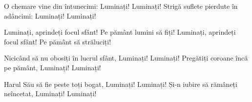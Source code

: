 \beginverse
O chemare vine din întunecimi:
Luminați! Luminați!
Strigă suflete pierdute în adâncimi:
Luminați! Luminați!
\endverse

\beginchorus
Luminați, aprindeți focul sfânt!
Pe pământ lumini să fiți!
Luminați, aprindeți focul sfânt!
Pe pământ să străluciți!
\endchorus

\beginverse
Nicicând să nu obosiți în lucrul sfânt,
Luminați! Luminați!
Pregătiți coroane încă pe pământ,
Luminați! Luminați!
\endverse

\beginverse
Harul Său să fie peste toți bogat,
Luminați! Luminați!
Și-n iubire să rămâneți neîncetat,
Luminați! Luminați!
\endverse
\endsong